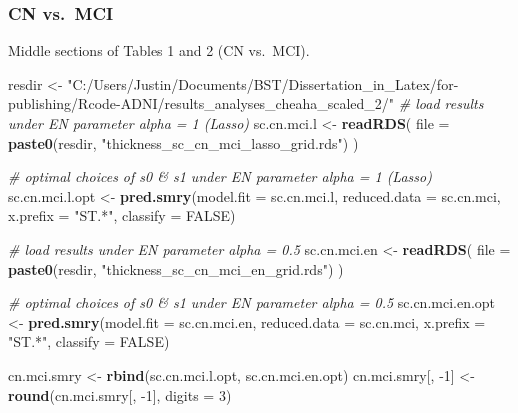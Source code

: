\documentclass[
]{article}
\newenvironment{Shaded}{\begin{snugshade}}{\end{snugshade}}
\newcommand{\CommentTok}[1]{\textcolor[rgb]{0.56,0.35,0.01}{\textit{#1}}}
\newcommand{\DataTypeTok}[1]{\textcolor[rgb]{0.13,0.29,0.53}{#1}}
\newcommand{\DecValTok}[1]{\textcolor[rgb]{0.00,0.00,0.81}{#1}}
\newcommand{\KeywordTok}[1]{\textcolor[rgb]{0.13,0.29,0.53}{\textbf{#1}}}
\newcommand{\NormalTok}[1]{#1}
\newcommand{\OtherTok}[1]{\textcolor[rgb]{0.56,0.35,0.01}{#1}}
\newcommand{\StringTok}[1]{\textcolor[rgb]{0.31,0.60,0.02}{#1}}
\begin{document}
\hypertarget{cn-vs.-mci}{%
\subsubsection{CN vs.~MCI}\label{cn-vs.-mci}}

Middle sections of Tables 1 and 2 (CN vs.~MCI).

\begin{Shaded}
\begin{Highlighting}[]
\NormalTok{resdir <-}\StringTok{ "C:/Users/Justin/Documents/BST/Dissertation_in_Latex/for-publishing/Rcode-ADNI/results_analyses_cheaha_scaled_2/"}
\CommentTok{# load results under EN parameter alpha = 1 (Lasso)}
\NormalTok{sc.cn.mci.l <-}\StringTok{ }\KeywordTok{readRDS}\NormalTok{(}
  \DataTypeTok{file =} \KeywordTok{paste0}\NormalTok{(resdir, }\StringTok{"thickness_sc_cn_mci_lasso_grid.rds"}\NormalTok{)}
\NormalTok{  )}

\CommentTok{# optimal choices of s0 & s1 under EN parameter alpha = 1 (Lasso)}
\NormalTok{sc.cn.mci.l.opt <-}\StringTok{ }\KeywordTok{pred.smry}\NormalTok{(}\DataTypeTok{model.fit =}\NormalTok{ sc.cn.mci.l,}
                             \DataTypeTok{reduced.data =}\NormalTok{ sc.cn.mci,}
                             \DataTypeTok{x.prefix =} \StringTok{"ST.*"}\NormalTok{,}
                             \DataTypeTok{classify =} \OtherTok{FALSE}\NormalTok{)}

\CommentTok{# load results under EN parameter alpha = 0.5}
\NormalTok{sc.cn.mci.en <-}\StringTok{ }\KeywordTok{readRDS}\NormalTok{(}
  \DataTypeTok{file =} \KeywordTok{paste0}\NormalTok{(resdir, }\StringTok{"thickness_sc_cn_mci_en_grid.rds"}\NormalTok{)}
\NormalTok{  )}

\CommentTok{# optimal choices of s0 & s1 under EN parameter alpha = 0.5}
\NormalTok{sc.cn.mci.en.opt <-}\StringTok{ }\KeywordTok{pred.smry}\NormalTok{(}\DataTypeTok{model.fit =}\NormalTok{ sc.cn.mci.en,}
                              \DataTypeTok{reduced.data =}\NormalTok{ sc.cn.mci,}
                              \DataTypeTok{x.prefix =} \StringTok{"ST.*"}\NormalTok{,}
                              \DataTypeTok{classify =} \OtherTok{FALSE}\NormalTok{)}

\NormalTok{cn.mci.smry <-}\StringTok{ }\KeywordTok{rbind}\NormalTok{(sc.cn.mci.l.opt,}
\NormalTok{                     sc.cn.mci.en.opt)}
\NormalTok{cn.mci.smry[, }\DecValTok{-1}\NormalTok{] <-}\StringTok{ }\KeywordTok{round}\NormalTok{(cn.mci.smry[, }\DecValTok{-1}\NormalTok{], }\DataTypeTok{digits =} \DecValTok{3}\NormalTok{)}
\end{Highlighting}
\end{Shaded}
\end{document}
